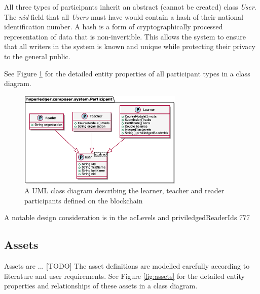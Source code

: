 All three types of participants inherit an abstract (cannot be created) class \textit{User}. The \textit{nid} field 
that all \textit{Users} must have would contain a hash of their national identification number. A hash is a form 
of cryptographically processed representation of data that is non-invertible. This allows the system to ensure that 
all writers in the system is known and unique while protecting their privacy to the general public.

See Figure \ref{fig:participants} for the detailed entity properties of all participant types 
in a class diagram.

\begin{figure}[!ht] 
    \centering    
    \includegraphics[width=0.7\textwidth]{participants}
    \caption[Participants Class Diagram]
        {A UML class diagram describing the learner, teacher and reader participants defined on the blockchain} 
    \label{fig:participants}
\end{figure}

A notable design consideration is in the acLevels and priviledgedReaderIds
777


\subsection{Assets}

Assets are ... [TODO]
The asset definitions are modelled carefully according to literature and user requirements.
See Figure \ref{fig:assets} for the detailed entity properties and relationships of these assets 
in a class diagram.

